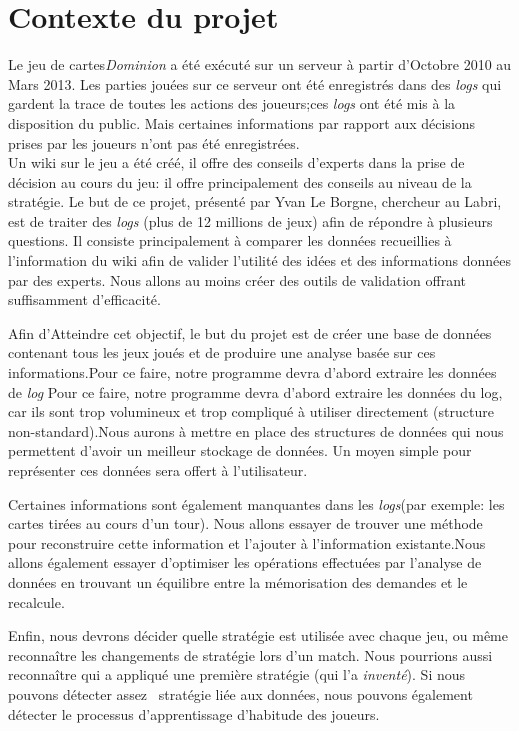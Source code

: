 \documentclass{scrreprt}
\begin{document}
\section{Contexte du projet}
  Le jeu de cartes\textit{Dominion} a été exécuté sur un serveur à partir d'Octobre 2010 au Mars 2013. Les parties jouées sur ce serveur ont été enregistrés dans des \textit{logs} qui gardent la trace de toutes les actions des joueurs;ces \textit{logs} ont été mis à la disposition du public. Mais certaines informations par rapport aux décisions prises par les joueurs n’ont pas été enregistrées.\\
 Un wiki sur le jeu a été créé, il offre des conseils d'experts dans la prise de décision au cours du jeu: il offre principalement des conseils au niveau de la stratégie. Le but de ce projet, présenté par Yvan Le Borgne, chercheur au Labri, est de traiter des \textit{logs} (plus de 12 millions de jeux) afin de répondre à plusieurs questions. Il consiste principalement à comparer les données recueillies à l'information du wiki afin de valider l'utilité des idées et des informations données par des experts. Nous allons au moins créer des outils de validation offrant suffisamment d'efficacité.
  
Afin d'Atteindre cet objectif, le but du projet est de créer une base de données contenant tous les jeux joués et de produire une analyse basée sur ces informations.Pour ce faire, notre programme devra d'abord extraire les données de  \textit{log} Pour ce faire, notre programme devra d'abord extraire les données du log, car ils sont trop volumineux et trop compliqué à utiliser directement (structure non-standard).Nous aurons à mettre en place des structures de données qui nous permettent d'avoir un meilleur stockage de données. Un moyen simple pour représenter ces données sera offert à l'utilisateur.

  Certaines informations sont également manquantes dans les \textit{logs}(par exemple: les cartes tirées au cours d'un tour). Nous allons essayer de trouver une méthode pour reconstruire cette information et l'ajouter à l'information existante.Nous allons également essayer d'optimiser les opérations effectuées par l'analyse de données en trouvant un équilibre entre la mémorisation des demandes et le recalcule.

  Enfin, nous devrons décider quelle stratégie est utilisée avec chaque jeu, ou même reconnaître les changements de stratégie lors d'un match. Nous pourrions aussi reconnaître qui a appliqué une première stratégie (qui l'a \textit{inventé}). Si nous pouvons détecter assez  stratégie liée aux données, nous pouvons également détecter le processus d'apprentissage d'habitude des joueurs.
\end{document}
